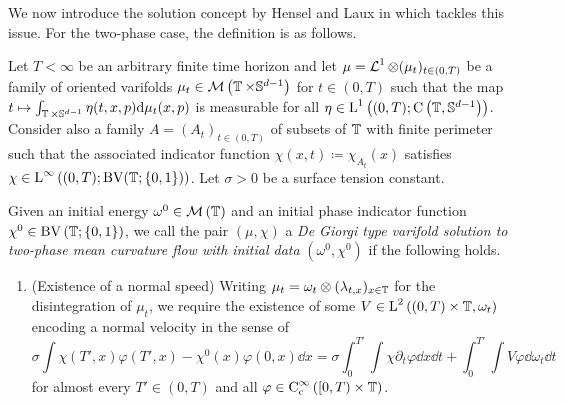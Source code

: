 We now introduce the solution concept by Hensel and Laux in 
\cite{hensel_laux_varifold_solution_concept_for_mean_curvature_flow} which 
tackles this issue. 
For the two-phase case, the definition is as follows.

\begin{definition}
	\label{de_giorgi_varifold_solution_for_mcf}
	Let $ T < \infty $ be an arbitrary finite time horizon and let $ \mu = 
	\operatorname{\mathcal{L}}^{ 1 } \otimes ( \mu_{ t } )_{ t \in ( 0 , T ) } $ be a 
	family of oriented varifolds $ \mu_{ t } \in \mathcal{ M } \left( 
	\operatorname{\mathbb{T}} \times \mathbb{ S }^{ d - 1 } \right) $ for $ t \in ( 0 , T ) 
	$ such that the map $ t \mapsto \int_{ \operatorname{\mathbb{T}} \times \mathbb{ S }^{ d 
			-1 } } \eta (t, x , p ) \dd \mu_{ t } ( x , p ) $ is measurable 
			for all 
	$ \eta \in \operatorname{L}^{ 1 } \left( ( 0 , T ) ; \operatorname{C} \left( \operatorname{\mathbb{T}}, 
	\mathbb{ S 
	}^{ d - 1 } \right) \right) $. 
	Consider also a family $ A = ( A_{ t } )_{ t \in ( 0 , T ) } $ of 
	subsets of $ \operatorname{\mathbb{T}} $ with finite perimeter such that the associated 
	indicator function $ \chi ( x , t ) \coloneqq \chi_{ A _{ t } } ( x ) $ 
	satisfies 
	$ \chi \in \operatorname{L}^{ \infty } \left( ( 0 , T ) ; \operatorname{BV} ( \operatorname{\mathbb{T}} ; \{ 0 , 
	1 \} ) \right) $.
	Let $ \sigma > 0 $ be a surface tension constant.
	
	Given an initial energy
	$ \omega^{ 0 } \in \mathcal{ M } \left( \operatorname{\mathbb{T}} \right) $ and an initial 
	phase indicator function $ \chi^{ 0 } \in \operatorname{BV} 
	\left( \operatorname{\mathbb{T}} ; \{ 0 , 1 \} \right)$, we call the pair $ ( \mu , \chi ) 
	$ a \emph{De Giorgi type varifold solution to two-phase mean curvature 
	flow 
		with initial data} $ ( \omega^{ 0 } , \chi^{ 0 } ) $ if the following 
		holds.
	\begin{enumerate}
		\item (Existence of a normal speed)
		Writing $ \mu_{ t } = \omega_{ t } \otimes ( \lambda_{ t, x } )_{ x 
			\in \operatorname{\mathbb{T}}} $ for the disintegration of $ \mu_{ t } $, we 
			require 
		the existence of some 
		$ V \in \operatorname{L}^{ 2 } \left( ( 0 , T ) \times \operatorname{\mathbb{T}} ,
		\omega_{ t } \right) $ encoding a normal velocity in the sense of
		\begin{equation}
			\label{equation_varifold_velocity}
			\sigma
			\int
			\chi ( T' , x ) \varphi ( T' , x ) 
			-
			\chi^{ 0 } ( x ) \varphi (0,x)
			\dd{ x }
			=
			\sigma
			\int_{ 0 }^{ T' }
			\int
			\chi
			\partial_{ t } \varphi 
			\dd{ x }
			\dd{ t }
			+
			\int_{ 0 }^{ T' }
			\int
			V \varphi 
			\dd{ \omega_{ t } }
			\dd{ t }
		\end{equation}
		for almost every $ T' \in ( 0 , T ) $ and all $ \varphi \in \operatorname{C}_{ 
			\mathrm{c} }^{ \infty } \left( [ 0 , T ) \times \operatorname{\mathbb{T}} \right) 
		$.
		

\end{enumerate}
\end{definition}
